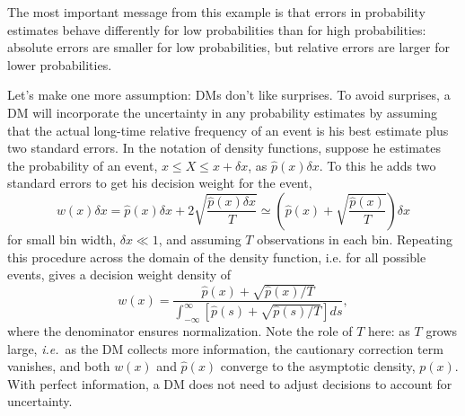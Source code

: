 \documentclass[a4paper, 12pt]{article}
\newcommand{\elabel}[1]{\label{eq:#1}}
\newcommand{\ie}{{\it i.e.}\ }
\newcommand{\be}{\begin{equation}}
\newcommand{\ee}{\end{equation}}
\begin{document}
The most important message from this example is that errors in probability estimates behave differently for low probabilities than for high probabilities: absolute errors are smaller for low probabilities, but relative errors are larger for lower probabilities. 

Let's make one more assumption: DMs don't like surprises. To avoid surprises, a DM will incorporate the uncertainty in any probability estimates by assuming that the actual long-time relative frequency of an event is his best estimate plus two standard errors. In the notation of density functions, suppose he estimates the probability of an event, $x \leq X \leq x+\delta x$, as $\hat{p}(x)\delta x$. To this he adds two standard errors to get his decision weight for the event,
\be
w(x)\delta x = \hat{p}(x)\delta x + 2\sqrt{\frac{\hat{p}(x)\delta x}{T}}
\simeq \left(\hat{p}(x) + \sqrt{\frac{\hat{p}(x)}{T}}\right)\delta x
\ee
for small bin width, $\delta x \ll 1$, and assuming $T$ observations in each bin. Repeating this procedure across the domain of the density function, i.e. for all possible events, gives a decision weight density of
\be
w(x)=\frac{\hat{p}(x)+\sqrt{\hat{p}(x)/T}}{\int_{-\infty}^{\infty}[\hat{p}(s)+\sqrt{\hat{p}(s)/T}] ds},
\elabel{Poisson}
\ee
where the denominator ensures normalization. Note the role of $T$ here: as $T$ grows large, \ie as the DM collects more information, the cautionary correction term vanishes, and both $w(x)$ and $\hat{p}(x)$ converge to the asymptotic density, $p(x)$. With perfect information, a DM does not need to adjust decisions to account for uncertainty.
\end{document}
